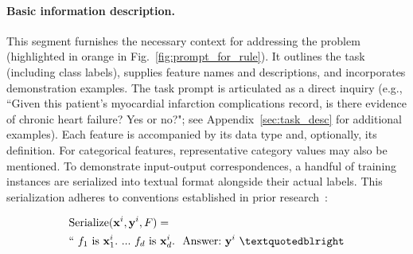 \vspace*{-0.12in}
\paragraph{Basic information description.} This segment furnishes the necessary context for addressing the problem (highlighted in orange in Fig.~\ref{fig:prompt_for_rule}). It outlines the task (including class labels), supplies feature names and descriptions, and incorporates demonstration examples. The task prompt is articulated as a direct inquiry (e.g., ``Given this patient's myocardial infarction complications record, is there evidence of chronic heart failure? Yes or no?"; see Appendix~\ref{sec:task_desc} for additional examples). Each feature is accompanied by its data type and, optionally, its definition. For categorical features, representative category values may also be mentioned. To demonstrate input-output correspondences, a handful of training instances are serialized into textual format alongside their actual labels. This serialization adheres to conventions established in prior research~\cite{dinh2022lift,hegselmann2023tabllm}:

\begin{align}
&\text{Serialize}(\mathbf{x}^i,\mathbf{y}^i, F) = \nonumber \\ 
&``\ f_1\ \text{is}\ \mathbf{x}^i_1.\ ... \ f_d\  \text{is}\  \mathbf{x}^i_d.\ \ \text{Answer:}\  \mathbf{y}^i\ ”
\end{align}

\vspace*{-0.12in}
